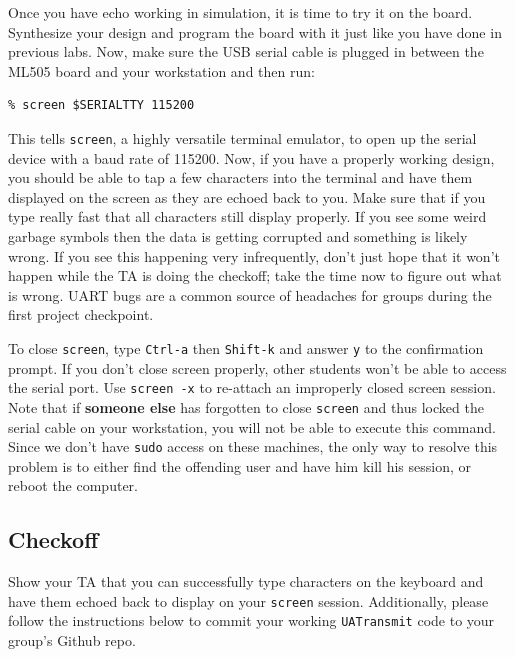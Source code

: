 \documentclass[11pt]{article}
\begin{document}
Once you have echo working in simulation, it is time to try it on the board. Synthesize your design and program the board with it just like you have done in previous labs. Now, make sure the USB serial cable is plugged in between the ML505 board and your workstation and then run:
\begin{verbatim}
% screen $SERIALTTY 115200
\end{verbatim}
This tells \verb|screen|, a highly versatile terminal emulator, to open up the serial device with a baud rate of 115200. Now, if you have a properly working design, you should be able to tap a few characters into the terminal and have them displayed on the screen as they are echoed back to you. Make sure that if you type really fast that all characters still display properly. If you see some weird garbage symbols then the data is getting corrupted and something is likely wrong. If you see this happening very infrequently, don't just hope that it won't happen while the TA is doing the checkoff; take the time now to figure out what is wrong. UART bugs are a common source of headaches for groups during the first project checkpoint. 

To close \verb|screen|, type \verb|Ctrl-a| then \verb|Shift-k| and answer \verb|y| to the confirmation prompt. If you don't close screen properly, other students won't be able to access the serial port. Use \verb|screen -x| to re-attach an improperly closed screen session. Note that if \textbf{someone else} has forgotten to close \verb|screen| and thus locked the serial cable on your workstation, you will not be able to execute this command. Since we don’t have \verb|sudo| access on these machines, the only way to resolve this problem is to either find the offending user and have him kill his session, or reboot the computer.

\subsection{Checkoff}
Show your TA that you can successfully type characters on the keyboard and have them echoed back to display on your \verb|screen| session. Additionally, please follow the instructions below to commit your working \verb|UATransmit| code to your group's Github repo.
\end{document}
